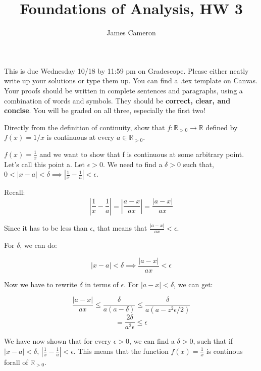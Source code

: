 \documentclass[answers]{exam}
\title{Foundations of Analysis, HW 3}
\author{James Cameron}
\date{}
\theoremstyle{remark}
\theoremstyle{definition}
\newcommand{\RR}{\mathbb{R}}
\begin{document}



 This is due Wednesday 10/18 by 11:59 pm on Gradescope. Please either neatly write up your solutions or type them up. You can find a .tex template on Canvas. Your proofs should be written in complete sentences and paragraphs, using a combination of words and symbols. They should be \textbf{correct, clear, and concise}. You will be graded on all three, especially the first two!

\noindent


\begin{questions}

\question[4] Directly from the definition of continuity, show that $f: \RR_{>0} \to \RR$ defined by $f(x)=1/x$ is continuous at every $a \in \RR_{>0}$.
\begin{solution}

$f(x) = \frac{1}{x}$ and we want to show that f is continuous at some arbitrary point.
Let's call this point a. Let $\epsilon > 0$. We need to find a $\delta > 0$ such that,
$0 < |x - a| < \delta \implies |\frac{1}{x} - \frac{1}{a}| < \epsilon$.

Recall:
\[\left| \frac{1}{x} - \frac{1}{a} \right| = \left| \frac{a-x}{ax} \right| = \frac{|a-x|}{ax}\]

Since it has to be less than $\epsilon$, that means that $\frac{|a-x|}{ax} < \epsilon$.

For $\delta$, we can do:

\[|x-a| < \delta \implies \frac{|a-x|}{ax} < \epsilon\]

Now we have to rewrite $\delta$ in terms of $\epsilon$.
For $|a-x| < \delta$, we can get:

\[\frac{|a-x|}{ax} \leq \frac{\delta}{a(a-\delta)} \leq \frac{\delta}{a(a-z^2 \epsilon/2)}\]
\[= \frac{2\delta}{a^2 \epsilon} \leq \epsilon\]

We have now shown that for every $\epsilon > 0$, we can find a $\delta > 0$,
such that if $|x - a| < \delta$, $|\frac{1}{x} - \frac{1}{a}| < \epsilon$.
This means that the function $f(x) = \frac{1}{x}$ is continous forall of $\RR_{>0}$.

\end{solution}


\end{questions}
\end{document}
